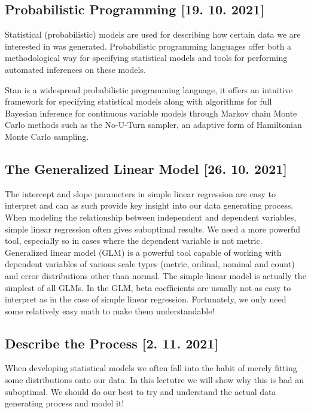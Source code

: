 \documentclass[fleqn,moreauthors,10pt]{ds_report}
\begin{document}
\subsection*{Probabilistic Programming [19. 10. 2021]}

Statistical (probabilistic) models are used for describing how certain data we are interested in was generated. Probabilistic programming languages offer both a methodological way for specifying statistical models and tools for performing automated inferences on these models.

Stan is a widespread probabilistic programming language, it offers an intuitive framework for specifying statistical models along with algorithms for full Bayesian inference for continuous variable models through Markov chain Monte Carlo methods such as the No-U-Turn sampler, an adaptive form of Hamiltonian Monte Carlo sampling.

\subsection*{The Generalized Linear Model [26. 10. 2021]}

The intercept and slope parameters in simple linear regression are easy to interpret and can as such provide key insight into our data generating process. When modeling the relationship between independent and dependent variables, simple linear regression often gives suboptimal results. We need a more powerful tool, especially so in cases where the dependent variable is not metric. Generalized linear model (GLM) is a powerful tool capable of working with dependent variables of various scale types (metric, ordinal, nominal and count) and error distributions other than normal. The simple linear model is actually the simplest of all GLMs. In the GLM, beta coefficients are usually not as easy to interpret as in the case of simple linear regression. Fortunately, we only need some relatively easy math to make them understandable!

\subsection*{Describe the Process [2. 11. 2021]}

When developing statistical models we often fall into the habit of merely fitting some distributions onto our data. In this lectutre we will show why this is bad an suboptimal. We should do our best to try and understand the actual data generating process and model it!
\end{document}
